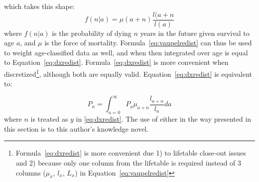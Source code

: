 which takes this shape:
\begin{equation}
\label{eq:vaupelredist}
f(n | a) = \mu (a+n) \frac{l(a+n}{l(a)}
\end{equation}
where $f(n | a) $ is the probability of dying $n$ years in the future given
survival to age $a$, and $\mu$ is the force of mortality.
Formula~\eqref{eq:vaupelredist} can thus be used to weight age-classified data
as well, and when then integrated over age is equal to
Equation~\eqref{eq:dxredist}. Formula~\eqref{eq:dxredist} is more convenient when 
discretized\footnote{Formula~\eqref{eq:dxredist} is more convenient due 1) to lifetable 
close-out issues and 2) because only one column from the lifetable is required instead 
of 3 columns ($\mu_x$, $l_x$, $L_x$) in
Equation~\eqref{eq:vaupelredist} }, although both are equally valid.
Equation~\ref{eq:dxredist} is equivalent to:

\begin{equation}
P_n = \int _{a=0} ^\infty P_a \mu_{a+n} \frac{l_{a+n}}{l_a} da
\end{equation}
where $n$ is treated as $y$ in \ref{eq:dxredist}.
The use of either in the way
presented in this section is to this author's knowledge novel.
